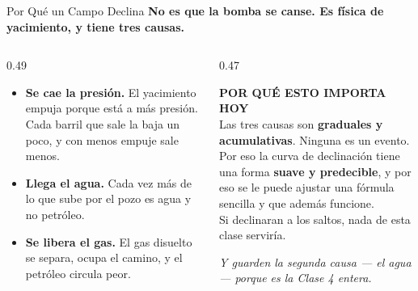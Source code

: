 \documentclass[aspectratio=169, 11pt]{beamer}
\begin{document}
\begin{frame}[shrink=8]{Por Qué un Campo Declina}
  \vspace{-4pt}
  {\small\color{arcaDark}\bfseries
   No es que la bomba se canse. Es física de yacimiento, y tiene tres causas.}
  \vspace{8pt}
  \begin{columns}[T]
    \begin{column}{0.49\textwidth}
      {\footnotesize\color{textMuted}
      \begin{itemize}\setlength{\itemsep}{6pt}
        \item[{\color{arcaRed}\scriptsize\faArrowDown}]
          \textbf{Se cae la presión.} El yacimiento empuja porque está a más
          presión. Cada barril que sale la baja un poco, y con menos empuje
          sale menos.
        \item[{\color{codeBlue}\scriptsize\faTint}]
          \textbf{Llega el agua.} Cada vez más de lo que sube por el pozo
          es agua y no petróleo.
        \item[{\color{codeOrange}\scriptsize\faFilter}]
          \textbf{Se libera el gas.} El gas disuelto se separa, ocupa el
          camino, y el petróleo circula peor.
      \end{itemize}}
    \end{column}
    \begin{column}{0.47\textwidth}
      \begin{tcolorbox}[colback=arcaGray, colframe=arcaDark, boxrule=0pt, leftrule=3pt,
        arc=3pt, left=6pt, right=6pt, top=5pt, bottom=5pt]
        {\scriptsize\color{arcaDark}\bfseries\faLightbulb[regular]\hspace{4pt}POR QUÉ ESTO IMPORTA HOY}\\[4pt]
        {\scriptsize\color{textMuted}
         Las tres causas son \textbf{graduales y acumulativas}. Ninguna es un
         evento.\\[4pt]
         Por eso la curva de declinación tiene una forma \textbf{suave y
         predecible}, y por eso se le puede ajustar una fórmula sencilla y
         que además funcione.\\[4pt]
         Si declinaran a los saltos, nada de esta clase serviría.}
      \end{tcolorbox}
      \vspace{5pt}
      {\scriptsize\color{arcaDark}\itshape
        Y guarden la segunda causa --- el agua --- porque es la
        Clase 4 entera.}
    \end{column}
  \end{columns}
\end{frame}
\end{document}
